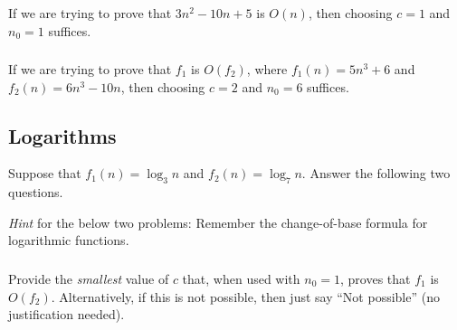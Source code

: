 \documentclass{article}
\begin{document}
\subsubsection{}

If we are trying to prove that $3n^2 - 10n + 5$ is $O(n)$, then choosing $c = 1$ and $n_0 = 1$ suffices.

\begin{mdframed}
\vspace{3em}
\end{mdframed}

\subsubsection{}

If we are trying to prove that $f_1$ is $O(f_2)$, where $f_1(n) = 5n^3 + 6$ and $f_2(n) = 6n^3 - 10n$, then choosing $c = 2$ and $n_0 = 6$ suffices.

\begin{mdframed}
\vspace{3em}
\end{mdframed}

\subsection{Logarithms}

Suppose that $f_1(n) = \log_{3} n$ and $f_2(n) = \log_{7} n$. Answer the following two questions.

\textit{Hint} for the below two problems: Remember the change-of-base formula for logarithmic functions.

\subsubsection{}

Provide the \textit{smallest} value of $c$ that, when used with $n_0 = 1$, proves that $f_1$ is $O(f_2)$. Alternatively, if this is not possible, then just say ``Not possible'' (no justification needed).

\begin{mdframed}
\vspace{3em}
\end{mdframed}

\subsubsection{}
\end{document}
